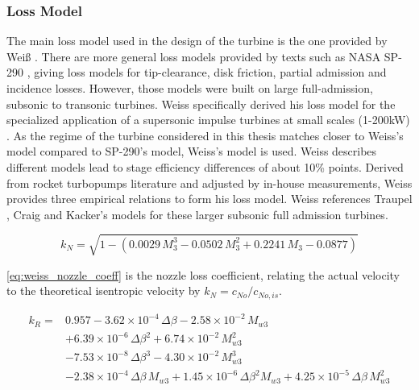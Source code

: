 
\subsubsection{Loss Model}
\label{subsec:weissloss}

The main loss model used in the design of the turbine is the one provided by Weiß \cite{weiss}. There are more general loss models provided by texts such as NASA SP-290 \cite{glassmanTurbineDesignApplication1994}, giving loss models for tip-clearance, disk friction, partial admission and incidence losses. However, those models were built on large full-admission, subsonic to transonic turbines. Weiss specifically derived his loss model for the specialized application of a supersonic impulse turbines at small scales (1-200kW) \cite{weissCustomizedORCMicro2020}. As the regime of the turbine considered in this thesis matches closer to Weiss's model compared to SP-290's model, Weiss's model is used. Weiss describes different models lead to stage efficiency differences of about 10\% points. Derived from rocket turbopumps literature and adjusted by in-house measurements, Weiss provides three empirical relations to form his loss model. Weiss references Traupel \cite{traupelThermischeTurbomaschinenZweiter2013}, Craig \cite{craigPerformanceEstimationAxial1970a} and Kacker's \cite{kackerMeanLinePrediction1982} models for these larger subsonic full admission turbines.

\begin{equation}
    k_N = \sqrt{1 - \left( 0.0029\,M_3^3 - 0.0502\,M_3^2 + 0.2241\,M_3 - 0.0877 \right)}
    \label{eq:weiss_nozzle_coeff}
\end{equation}

\cref{eq:weiss_nozzle_coeff} is the nozzle loss coefficient, relating the actual velocity to the theoretical isentropic velocity by $k_N=c_{No}/c_{No,is}$. 

\begin{equation}
    \begin{aligned}
        k_R ={}& 0.957
            - 3.62\times10^{-4}\,\Delta\beta
            - 2.58\times10^{-2}\,M_{w3} \\
            &+ 6.39\times10^{-6}\,\Delta\beta^2
            + 6.74\times10^{-2}\,M_{w3}^2 \\
            &- 7.53\times10^{-8}\,\Delta\beta^3
            - 4.30\times10^{-2}\,M_{w3}^3 \\
            &- 2.38\times10^{-4}\,\Delta\beta\, M_{w3}
            + 1.45\times10^{-6}\,\Delta\beta^2 M_{w3}
            + 4.25\times10^{-5}\,\Delta\beta\, M_{w3}^2
    \end{aligned}
    \label{eq:weiss_rotor_coeff}
\end{equation}

